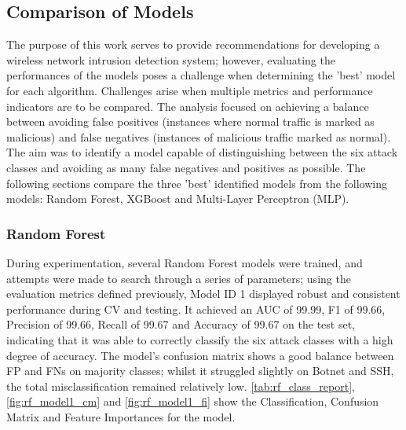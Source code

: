 \subsection{Comparison of Models}

The purpose of this work serves to provide recommendations for developing a wireless network intrusion detection system; however, evaluating the performances of the models poses a challenge when determining the 'best' model for each algorithm. Challenges arise when multiple metrics and performance indicators are to be compared. The analysis focused on achieving a balance between avoiding false positives (instances where normal traffic is marked as malicious) and false negatives (instances of malicious traffic marked as normal). The aim was to identify a model capable of distinguishing between the six attack classes and avoiding as many false negatives and positives as possible. The following sections compare the three 'best' identified models from the following models: Random Forest, XGBoost and Multi-Layer Perceptron (MLP).

\subsubsection*{Random Forest}

During experimentation, several Random Forest models were trained, and attempts were made to search through a series of parameters; using the evaluation metrics defined previously, Model ID 1 displayed robust and consistent performance during CV and testing. It achieved an AUC of 99.99, F1 of 99.66, Precision of 99.66, Recall of 99.67 and Accuracy of 99.67 on the test set, indicating that it was able to correctly classify the six attack classes with a high degree of accuracy. The model's confusion matrix shows a good balance between FP and FNs on majority classes; whilst it struggled slightly on Botnet and SSH, the total misclassification remained relatively low. \ref{tab:rf_class_report}, \ref{fig:rf_model1_cm} and \ref{fig:rf_model1_fi} show the Classification, Confusion Matrix and Feature Importances for the model.

